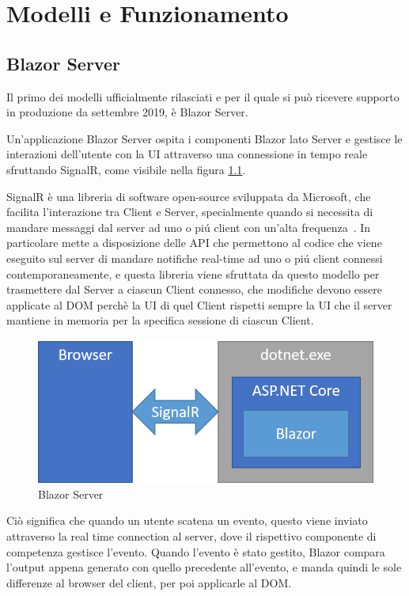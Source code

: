 \chapter{Modelli e Funzionamento}\label{cap:modefunz}
\section{Blazor Server}\label{sez:bserver}
Il primo dei modelli ufficialmente rilasciati e per il quale si pu\`o ricevere supporto in produzione da settembre 2019\cite{blazorServerRelease}, \`e Blazor Server.

Un'applicazione Blazor Server ospita i componenti Blazor lato Server e gestisce le interazioni dell'utente con la UI attraverso una connessione in tempo reale sfruttando SignalR, come visibile nella figura \ref{fig:BlazorServer}.

SignalR \`e una libreria di software open-source sviluppata da Microsoft, che facilita l'interazione tra Client e Server, specialmente quando si necessita di mandare messaggi dal server ad uno o pi\'u client con un'alta frequenza~\cite{signalR}.
In particolare mette a disposizione delle API che permettono al codice che viene eseguito sul server di mandare notifiche real-time ad uno o pi\'u client connessi contemporaneamente, e questa libreria viene sfruttata da questo modello per trasmettere dal Server a ciascun Client connesso, che modifiche devono essere applicate al DOM perch\`e la UI di quel Client rispetti sempre la UI che il server mantiene in memoria per la specifica sessione di ciascun Client.

\begin{figure}[H]
	\centerline{\includegraphics[scale=0.6]{figure/blazor-server.png}}
	\caption{Blazor Server}
	\label{fig:BlazorServer}
\end{figure}

Ci\`o significa che quando un utente scatena un evento, questo viene inviato attraverso la real time connection al server, dove il rispettivo componente di competenza gestisce l'evento.
Quando l'evento \`e stato gestito, Blazor compara l'output appena generato con quello precedente all'evento, e manda quindi le sole differenze al browser del client, per poi applicarle al DOM.\cite{blazorModelsScenarios}

